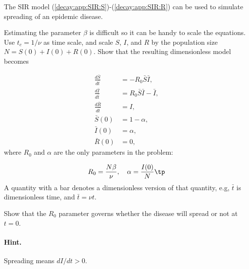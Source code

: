 \documentclass[graybox,sectrefs,envcountresetchap,open=right,final]{svmonodo}
\makeatletter
\newenvironment{doconceexercise}{}{}
\newcounter{doconceexercisecounter}%
\newcommand\listofexercises{
\chapter*{List of Exercises, Problems, and Projects
          \@mkboth{List of Exercises, Problems, and Projects}{List of Exercises, Problems, and Projects}}
\markboth{List of Exercises, Problems, and Projects}{List of Exercises, Problems, and Projects}
\@starttoc{loe}
}
\makeatother
\begin{document}
\begin{doconceexercise}

                
\label{decay:app:exer:SIR}

The SIR model (\ref{decay:app:SIR:S})-(\ref{decay:app:SIR:R}) can be used
to simulate spreading of an epidemic disease.

Estimating the parameter $\beta$
is difficult so it can be handy to scale the equations. Use
$t_c=1/\nu$ as time scale, and scale $S$, $I$, and $R$ by
the population size $N=S(0)+I(0)+R(0)$. Show that the resulting dimensionless
model becomes

\begin{align}
\frac{d\bar S}{d\bar t} &= - R_0\bar S\bar I,
\label{decay:app:SIR:S2}\\ 
\frac{d\bar I}{d\bar t} &= R_0 \bar S\bar I - \bar I,
\label{decay:app:SIR:I2}\\ 
\frac{d\bar R}{d\bar t} &= I,
\label{decay:SIR:R2}\\ 
\bar S(0) &= 1-\alpha,\\ 
\bar I(0) &= \alpha,\\ 
\bar R(0) &= 0,
\end{align}
where $R_0$ and $\alpha$ are the only parameters in the problem:

\[ R_0 = \frac{N\beta}{\nu}, \quad \alpha = \frac{I(0)}{N}\tp\]
A quantity with a bar denotes a dimensionless version of that quantity, e.g,
$\bar t$ is dimensionless time, and $\bar t = \nu t$.



Show that the $R_0$ parameter governs whether the disease will spread
or not at $t=0$.


\paragraph{Hint.}
Spreading means $dI/dt>0$.


\end{doconceexercise}
\end{document}

